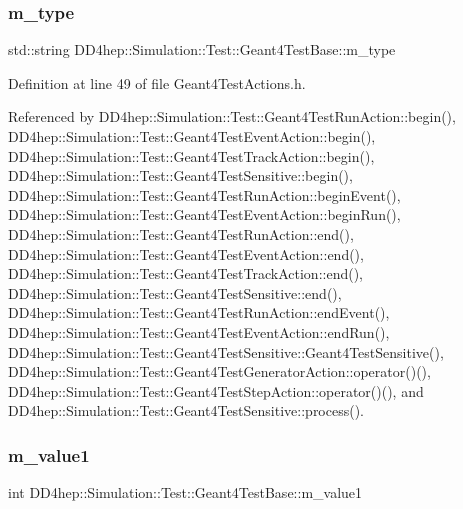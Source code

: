 \subsubsection{\texorpdfstring{m\+\_\+type}{m\_type}}
{\footnotesize\ttfamily std\+::string D\+D4hep\+::\+Simulation\+::\+Test\+::\+Geant4\+Test\+Base\+::m\+\_\+type\hspace{0.3cm}{\ttfamily [protected]}}



Definition at line 49 of file Geant4\+Test\+Actions.\+h.



Referenced by D\+D4hep\+::\+Simulation\+::\+Test\+::\+Geant4\+Test\+Run\+Action\+::begin(), D\+D4hep\+::\+Simulation\+::\+Test\+::\+Geant4\+Test\+Event\+Action\+::begin(), D\+D4hep\+::\+Simulation\+::\+Test\+::\+Geant4\+Test\+Track\+Action\+::begin(), D\+D4hep\+::\+Simulation\+::\+Test\+::\+Geant4\+Test\+Sensitive\+::begin(), D\+D4hep\+::\+Simulation\+::\+Test\+::\+Geant4\+Test\+Run\+Action\+::begin\+Event(), D\+D4hep\+::\+Simulation\+::\+Test\+::\+Geant4\+Test\+Event\+Action\+::begin\+Run(), D\+D4hep\+::\+Simulation\+::\+Test\+::\+Geant4\+Test\+Run\+Action\+::end(), D\+D4hep\+::\+Simulation\+::\+Test\+::\+Geant4\+Test\+Event\+Action\+::end(), D\+D4hep\+::\+Simulation\+::\+Test\+::\+Geant4\+Test\+Track\+Action\+::end(), D\+D4hep\+::\+Simulation\+::\+Test\+::\+Geant4\+Test\+Sensitive\+::end(), D\+D4hep\+::\+Simulation\+::\+Test\+::\+Geant4\+Test\+Run\+Action\+::end\+Event(), D\+D4hep\+::\+Simulation\+::\+Test\+::\+Geant4\+Test\+Event\+Action\+::end\+Run(), D\+D4hep\+::\+Simulation\+::\+Test\+::\+Geant4\+Test\+Sensitive\+::\+Geant4\+Test\+Sensitive(), D\+D4hep\+::\+Simulation\+::\+Test\+::\+Geant4\+Test\+Generator\+Action\+::operator()(), D\+D4hep\+::\+Simulation\+::\+Test\+::\+Geant4\+Test\+Step\+Action\+::operator()(), and D\+D4hep\+::\+Simulation\+::\+Test\+::\+Geant4\+Test\+Sensitive\+::process().

\hypertarget{class_d_d4hep_1_1_simulation_1_1_test_1_1_geant4_test_base_ae953f3bd81b4ee602820d75dd39ddceb}{}\label{class_d_d4hep_1_1_simulation_1_1_test_1_1_geant4_test_base_ae953f3bd81b4ee602820d75dd39ddceb} 
\subsubsection{\texorpdfstring{m\+\_\+value1}{m\_value1}}
{\footnotesize\ttfamily int D\+D4hep\+::\+Simulation\+::\+Test\+::\+Geant4\+Test\+Base\+::m\+\_\+value1\hspace{0.3cm}{\ttfamily [protected]}}



